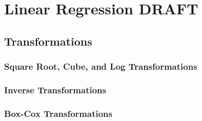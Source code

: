 \chapter{Linear Regression {\color{red} DRAFT} \label{chapter:linreg}}

\section{Transformations} 

\subsection{Square Root, Cube, and Log Transformations}

\subsection{Inverse Transformations}

\subsection{Box-Cox Transformations}